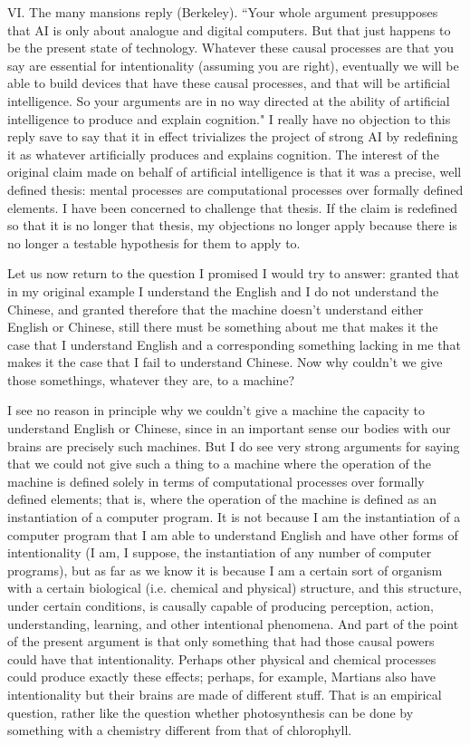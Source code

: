 VI. The many mansions reply (Berkeley). ``Your whole argument presupposes that AI is only about analogue
and digital computers. But that just happens to be the present state of technology. Whatever these causal
processes are that you say are essential for intentionality (assuming you are right), eventually we will be able to
build devices that have these causal processes, and that will be artificial intelligence. So your arguments are in
no way directed at the ability of artificial intelligence to produce and explain cognition."
I really have no objection to this reply save to say that it in effect trivializes the project of strong AI by
redefining it as whatever artificially produces and explains cognition. The interest of the original claim made on
behalf of artificial intelligence is that it was a precise, well defined thesis: mental processes are computational
processes over formally defined elements. I have been concerned to challenge that thesis. If the claim is
redefined so that it is no longer that thesis, my objections no longer apply because there is no longer a testable
hypothesis for them to apply to.

Let us now return to the question I promised I would try to answer: granted that in my original example I
understand the English and I do not understand the Chinese, and granted therefore that the machine doesn't
understand either English or Chinese, still there must be something about me that makes it the case that I
understand English and a corresponding something lacking in me that makes it the case that I fail to understand
Chinese. Now why couldn't we give those somethings, whatever they are, to a machine?

I see no reason in principle why we couldn't give a machine the capacity to understand English or Chinese,
since in an important sense our bodies with our brains are precisely such machines. But I do see very strong
arguments for saying that we could not give such a thing to a machine where the operation of the machine is
defined solely in terms of computational processes over formally defined elements; that is, where the operation
of the machine is defined as an instantiation of a computer program. It is not because I am the instantiation of a
computer program that I am able to understand English and have other forms of intentionality (I am, I suppose,
the instantiation of any number of computer programs), but as far as we know it is because I am a certain sort
of organism with a certain biological (i.e. chemical and physical) structure, and this structure, under certain
conditions, is causally capable of producing perception, action, understanding, learning, and other intentional
phenomena. And part of the point of the present argument is that only something that had those causal powers
could have that intentionality. Perhaps other physical and chemical processes could produce exactly these
effects; perhaps, for example, Martians also have intentionality but their brains are made of different stuff. That
is an empirical question, rather like the question whether photosynthesis can be done by something with a
chemistry different from that of chlorophyll.

